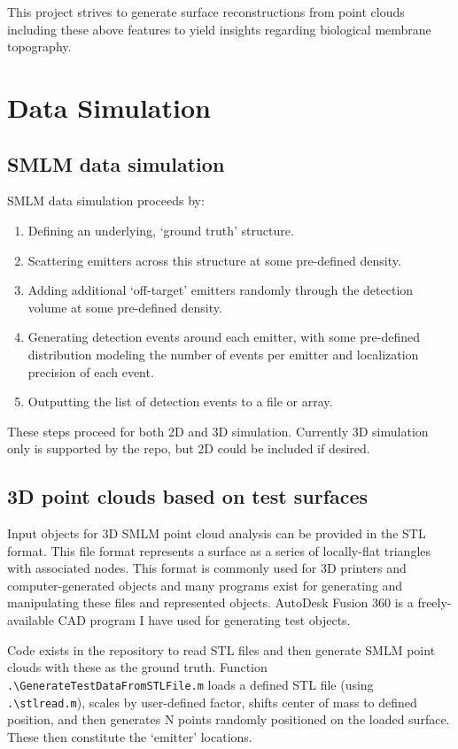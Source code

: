 \documentclass[10pt,a4paper]{article}
\begin{document}
This project strives to generate surface reconstructions from point clouds including these above features to yield insights regarding biological membrane topography. 

\section{Data Simulation}
\subsection{SMLM data simulation}
SMLM data simulation proceeds by:

\begin{enumerate}
	\item Defining an underlying, `ground truth' structure.
	\item Scattering emitters across this structure at some pre-defined density.
	\item Adding additional `off-target' emitters randomly through the detection volume at some pre-defined density. 
	\item Generating detection events around each emitter, with some pre-defined distribution modeling the number of events per emitter and localization precision of each event.  	
	\item Outputting the list of detection events to a file or array.
\end{enumerate}

These steps proceed for both 2D and 3D simulation.  Currently 3D simulation only is supported by the repo, but 2D could be included if desired.

\subsection{3D point clouds based on test surfaces}

Input objects for 3D SMLM point cloud analysis can be provided in the STL format.  This file format represents a surface as a series of locally-flat triangles with associated nodes.  This format is commonly used for 3D printers and computer-generated objects and many programs exist for generating and manipulating these files and represented objects.  AutoDesk Fusion 360 is a freely-available CAD program I have used for generating test objects.  

Code exists in the repository to read STL files and then generate SMLM point clouds with these as the ground truth.  Function \texttt{.\textbackslash GenerateTestDataFromSTLFile.m} loads a defined STL file (using \texttt{.\textbackslash stlread.m}), scales by user-defined factor, shifts center of mass to defined position, and then generates N points randomly positioned on the loaded surface.  These then constitute the `emitter' locations.  
\end{document}
